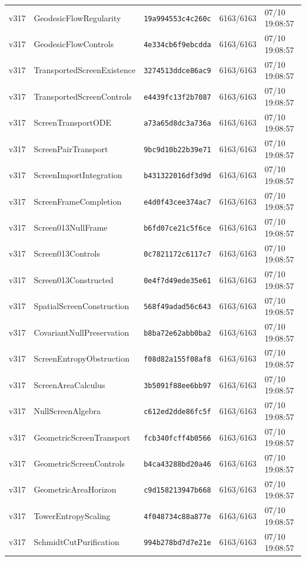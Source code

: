 \documentclass[11pt]{article}
\theoremstyle{definition}\newtheorem{deriv}{Derivation}
\begin{document}
{\begin{longtable}{@{}lllll@{}}
v317 & GeodesicFlowRegularity & \texttt{19a994553c4c260c} & 6163/6163 & 07/10 19:08:57 \\
v317 & GeodesicFlowControls & \texttt{4e334cb6f9ebcdda} & 6163/6163 & 07/10 19:08:57 \\
v317 & TransportedScreenExistence & \texttt{3274513ddce86ac9} & 6163/6163 & 07/10 19:08:57 \\
v317 & TransportedScreenControls & \texttt{e4439fc13f2b7087} & 6163/6163 & 07/10 19:08:57 \\
v317 & ScreenTransportODE & \texttt{a73a65d8dc3a736a} & 6163/6163 & 07/10 19:08:57 \\
v317 & ScreenPairTransport & \texttt{9bc9d10b22b39e71} & 6163/6163 & 07/10 19:08:57 \\
v317 & ScreenImportIntegration & \texttt{b431322016df3d9d} & 6163/6163 & 07/10 19:08:57 \\
v317 & ScreenFrameCompletion & \texttt{e4d0f43cee374ac7} & 6163/6163 & 07/10 19:08:57 \\
v317 & Screen013NullFrame & \texttt{b6fd07ce21c5f6ce} & 6163/6163 & 07/10 19:08:57 \\
v317 & Screen013Controls & \texttt{0c7821172c6117c7} & 6163/6163 & 07/10 19:08:57 \\
v317 & Screen013Constructed & \texttt{0e4f7d49ede35e61} & 6163/6163 & 07/10 19:08:57 \\
v317 & SpatialScreenConstruction & \texttt{568f49adad56c643} & 6163/6163 & 07/10 19:08:57 \\
v317 & CovariantNullPreservation & \texttt{b8ba72e62abb0ba2} & 6163/6163 & 07/10 19:08:57 \\
v317 & ScreenEntropyObstruction & \texttt{f08d82a155f08af8} & 6163/6163 & 07/10 19:08:57 \\
v317 & ScreenAreaCalculus & \texttt{3b5091f88ee6bb97} & 6163/6163 & 07/10 19:08:57 \\
v317 & NullScreenAlgebra & \texttt{c612ed2dde86fc5f} & 6163/6163 & 07/10 19:08:57 \\
v317 & GeometricScreenTransport & \texttt{fcb340fcff4b0566} & 6163/6163 & 07/10 19:08:57 \\
v317 & GeometricScreenControls & \texttt{b4ca43288bd20a46} & 6163/6163 & 07/10 19:08:57 \\
v317 & GeometricAreaHorizon & \texttt{c9d158213947b668} & 6163/6163 & 07/10 19:08:57 \\
v317 & TowerEntropyScaling & \texttt{4f048734c88a877e} & 6163/6163 & 07/10 19:08:57 \\
v317 & SchmidtCutPurification & \texttt{994b278bd7d7e21e} & 6163/6163 & 07/10 19:08:57 \\

\end{longtable}}
\end{document}
